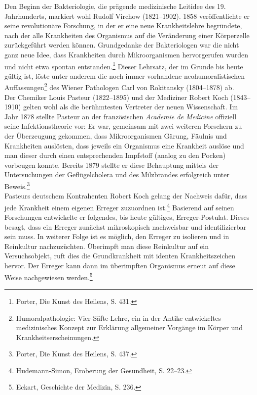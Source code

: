 \documentclass[
    a4paper,
    12pt,
    hyphens,
    chapterprefix=true,
    headheight=33pt,
    footheight=29pt,
    headings=optiontohead, %
]{scrartcl}
\begin{document}
Den Beginn der Bakteriologie, die prägende medizinische Leitidee des 19. Jahrhunderts, markiert wohl Rudolf Virchow (1821--1902). 1858 veröffentlichte er seine revolutionäre Forschung, in der er eine neue Krankheitslehre begründete, nach der alle Krankheiten des Organismus auf die Veränderung einer Körperzelle zurückgeführt werden können. Grundgedanke der Bakteriologen war die nicht ganz neue Idee, dass Krankheiten durch Mikroorganismen hervorgerufen wurden und nicht etwa spontan entstanden.\footnote{Porter, Die Kunst des Heilens, S. 431.} Dieser Lehrsatz, der im Grunde bis heute gültig ist, löste unter anderem die noch immer vorhandene neohumoralistischen Auffassungen\footnote{Humoralpathologie: Vier-Säfte-Lehre, ein in der Antike entwickeltes medizinisches Konzept zur Erklärung allgemeiner Vorgänge im Körper und Krankheitserscheinungen.} des Wiener Pathologen Carl von Rokitansky (1804--1878) ab.\\
Der Chemiker Louis Pasteur (1822--1895) und der Mediziner Robert Koch (1843--1910) gelten wohl als die berühmtesten Vertreter der neuen Wissenschaft. Im Jahr 1878 stellte Pasteur an der französischen \textit{Academie de Medicine} offiziell seine Infektionstheorie vor: Er war, gemeinsam mit zwei weiteren Forschern zu der Überzeugung gekommen, dass Mikroorganismen Gärung, Fäulnis und Krankheiten auslösten, dass jeweils ein Organismus eine Krankheit auslöse und man dieser durch einen entsprechenden Impfstoff (analog zu den Pocken) vorbeugen konnte. Bereits 1879 stellte er diese Behauptung mittels der Untersuchungen der Geflügelcholera und des Milzbrandes erfolgreich unter Beweis.\footnote{Porter, Die Kunst des Heilens, S. 437.}\\
Pasteurs deutschem Kontrahenten Robert Koch gelang der Nachweis dafür, dass jede Krankheit einem eigenen Erreger zuzuordnen ist.\footnote{Hudemann-Simon, Eroberung der Gesundheit, S. 22--23.} Basierend auf seinen Forschungen entwickelte er folgendes, bis heute gültiges, Erreger-Postulat. Dieses besagt, dass ein Erreger zunächst mikroskopisch nachweisbar und identifizierbar sein muss. In weiterer Folge ist es möglich, den Erreger zu isolieren und in Reinkultur nachzuzüchten. Überimpft man diese Reinkultur auf ein Versuchsobjekt, ruft dies die Grundkrankheit mit identen Krankheitszeichen hervor. Der Erreger kann dann im überimpften Organismus erneut auf diese Weise nachgewiesen werden.\footnote{Eckart, Geschichte der Medizin, S. 236.}
\end{document}
